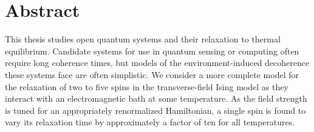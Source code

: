 \chapter*{Abstract}

This thesis studies open quantum systems and their relaxation to thermal
equilibrium. Candidate systems for use in quantum sensing or computing often
require long coherence times, but models of the environment-induced decoherence
these systems face are often simplistic. We consider a more complete model for
the relaxation of two to five spins in the transverse-field Ising model as they
interact with an electromagnetic bath at some temperature. As the field strength
is tuned for an appropriately renormalized Hamiltonian, a single spin is found
to vary its relaxation time by approximately a factor of ten for all
temperatures.

